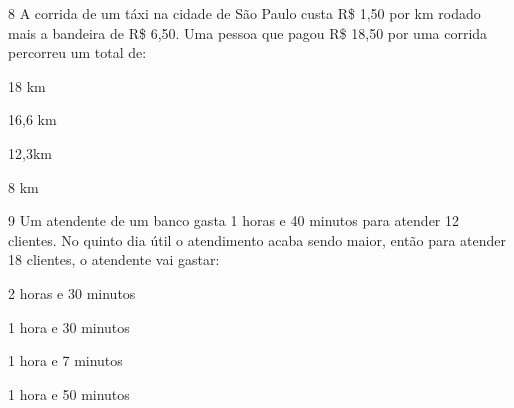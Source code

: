 \num{8} A corrida de um táxi na cidade de São Paulo custa
R\$ 1,50 por km rodado mais a bandeira de R\$ 6,50. Uma pessoa que pagou
R\$ 18,50 por uma corrida percorreu um total de:

\begin{escolha}
\item 18 km
\item 16,6 km
\item 12,3km 
\item 8 km
\end{escolha}




\num{9} Um atendente de um banco gasta 1 horas e 40 minutos para atender 12
clientes. No quinto dia útil o atendimento acaba sendo maior, então para
atender 18 clientes, o atendente vai gastar:

\begin{escolha}
\item 2 horas e 30 minutos
\item 1 hora e 30 minutos
\item 1 hora e 7 minutos
\item 1 hora e 50 minutos
\end{escolha}



